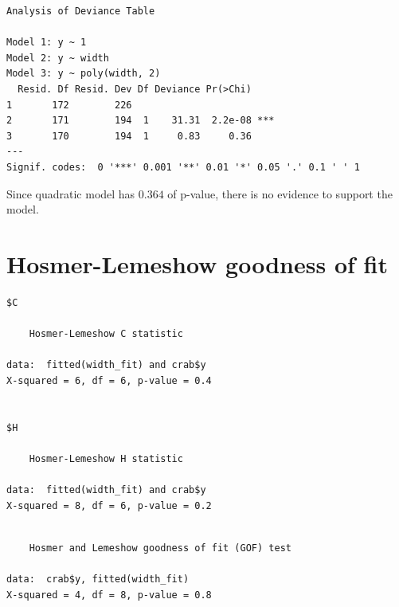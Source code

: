 \documentclass[]{book}
\newenvironment{Shaded}{\begin{snugshade}}{\end{snugshade}}
\newcommand{\DataTypeTok}[1]{\textcolor[rgb]{0.13,0.29,0.53}{#1}}
\newcommand{\DecValTok}[1]{\textcolor[rgb]{0.00,0.00,0.81}{#1}}
\newcommand{\KeywordTok}[1]{\textcolor[rgb]{0.13,0.29,0.53}{\textbf{#1}}}
\newcommand{\NormalTok}[1]{#1}
\newcommand{\OperatorTok}[1]{\textcolor[rgb]{0.81,0.36,0.00}{\textbf{#1}}}
\begin{document}
\begin{verbatim}
Analysis of Deviance Table

Model 1: y ~ 1
Model 2: y ~ width
Model 3: y ~ poly(width, 2)
  Resid. Df Resid. Dev Df Deviance Pr(>Chi)    
1       172        226                         
2       171        194  1    31.31  2.2e-08 ***
3       170        194  1     0.83     0.36    
---
Signif. codes:  0 '***' 0.001 '**' 0.01 '*' 0.05 '.' 0.1 ' ' 1
\end{verbatim}

Since quadratic model has \(0.364\) of p-value, there is no evidence to support the model.

\hypertarget{hosmer-lemeshow-goodness-of-fit}{%
\section{Hosmer-Lemeshow goodness of fit}\label{hosmer-lemeshow-goodness-of-fit}}

\begin{Shaded}
\end{Shaded}

\begin{verbatim}
$C

    Hosmer-Lemeshow C statistic

data:  fitted(width_fit) and crab$y
X-squared = 6, df = 6, p-value = 0.4


$H

    Hosmer-Lemeshow H statistic

data:  fitted(width_fit) and crab$y
X-squared = 8, df = 6, p-value = 0.2
\end{verbatim}

\begin{Shaded}
\end{Shaded}

\begin{verbatim}

    Hosmer and Lemeshow goodness of fit (GOF) test

data:  crab$y, fitted(width_fit)
X-squared = 4, df = 8, p-value = 0.8
\end{verbatim}
\end{document}
